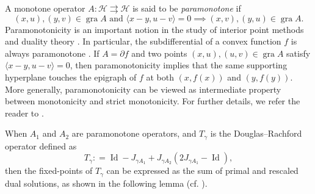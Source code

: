 \documentclass[a4paper,12pt]{article}
\DeclareMathOperator{\Id}{Id}
\DeclareMathOperator{\gra}{gra}
\newcommand{\setto}{\rightrightarrows}
\begin{document}
A monotone operator $A\colon\mathcal{H}\setto\mathcal{H}$ is said to be \emph{paramonotone} if
\begin{equation}\label{def of paramonotone}
(x,u),(y,v)\in\gra A \text{~and~} \langle x-y,u-v\rangle=0\implies (x,v),(y,u)\in\gra A.
\end{equation}
Paramonotonicity is an important notion in the study of interior point methods and duality theory \cite{iusem1998some,bauschke2014rectangularity}. In particular, the subdifferential of a convex function $f$ is always paramonotone \cite[Proposition~2.2]{iusem1998some}. If $A=\partial f$ and two points $(x,u),(u,v)\in\gra A$ satisfy $\langle x-y,u-v\rangle=0$, then paramonotonicity implies that the same supporting hyperplane touches the epigraph of $f$ at both $(x,f(x))$ and $(y,f(y))$. More generally, paramonotonicity can be viewed as intermediate property between monotonicity and strict monotonicity. For further details, we refer the reader to \cite{iusem1998some,bauschke2014rectangularity,censor1998interior}.

When $A_1$ and $A_2$ are paramonotone operators, and $T_\gamma$ is the Douglas--Rachford operator defined as
\begin{equation}\label{DR operator in pri}
    T_{\gamma}: = \Id-J_{\gamma A_1}+J_{\gamma A_2}(2J_{\gamma A_1}-\Id),
    \end{equation}
then the fixed-points of $T_\gamma$ can be expressed as the sum of primal and rescaled dual solutions, as shown in the following lemma (cf. \cite[Proposition~1]{pena2021linear}).
\end{document}
